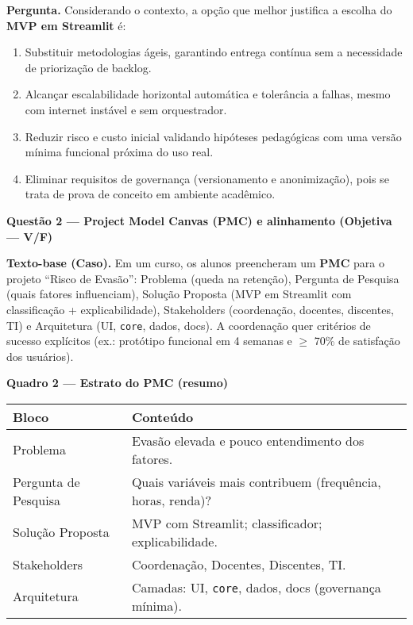 \documentclass[12pt,a4paper]{article}
\begin{document}
\noindent\textbf{Pergunta.} Considerando o contexto, a opção que melhor justifica a escolha do \textbf{MVP em Streamlit} é:
\begin{enumerate}[label=\alph*)]
\item Substituir metodologias ágeis, garantindo entrega contínua sem a necessidade de priorização de backlog.
\item Alcançar escalabilidade horizontal automática e tolerância a falhas, mesmo com internet instável e sem orquestrador.
\item Reduzir risco e custo inicial validando hipóteses pedagógicas com uma versão mínima funcional próxima do uso real.
\item Eliminar requisitos de governança (versionamento e anonimização), pois se trata de prova de conceito em ambiente acadêmico.
\end{enumerate}

\newpage
\noindent\textbf{Questão 2 — Project Model Canvas (PMC) e alinhamento (Objetiva — V/F)}
\par\noindent\textbf{Texto-base (Caso).} Em um curso, os alunos preencheram um \textbf{PMC} para o projeto “Risco de Evasão”: Problema (queda na retenção), Pergunta de Pesquisa (quais fatores influenciam), Solução Proposta (MVP em Streamlit com classificação + explicabilidade), Stakeholders (coordenação, docentes, discentes, TI) e Arquitetura (UI, \texttt{core}, dados, docs). A coordenação quer critérios de sucesso explícitos (ex.: protótipo funcional em 4 semanas e \(\geq\) 70\% de satisfação dos usuários).

\vspace{0.5em}
\noindent\textbf{Quadro 2 — Estrato do PMC (resumo)}
\begin{center}
\begin{tabular}{p{}p{}}
\toprule
\textbf{Bloco} & \textbf{Conteúdo}\\\midrule
Problema & Evasão elevada e pouco entendimento dos fatores.\\
Pergunta de Pesquisa & Quais variáveis mais contribuem (frequência, horas, renda)?\\
Solução Proposta & MVP com Streamlit; classificador; explicabilidade.\\
Stakeholders & Coordenação, Docentes, Discentes, TI.\\
Arquitetura & Camadas: UI, \texttt{core}, dados, docs (governança mínima).\\
\bottomrule
\end{tabular}
\end{center}
\end{document}
